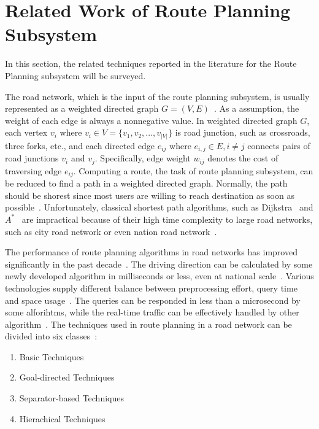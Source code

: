 \documentclass[conference]{IEEEtran}
\begin{document}
\section{Related Work of Route Planning Subsystem}\label{sec:route_planner}
In this section, the related techniques reported in the literature for the Route Planning subsystem will be surveyed.

The road network, which is the input of the route planning subsystem, is usually represented as a weighted directed graph $G=(V, E)$~\cite{self_driving}. As a assumption, the weight of each edge is always a nonnegative value. In weighted directed graph $G$, each vertex $v_i$ where $v_i \in V=\{v_1, v_2, ..., v_{|V|}\}$ is road junction, such as crossroads, three forks, etc., and each directed edge $e_{ij}$ where $e_{i,j} \in E, i \neq j$ connects pairs of road junctions $v_i$ and $v_j$. Specifically, edge weight $w_{ij}$ denotes the cost of traversing edge $e_{ij}$. Computing a route, the task of route planning subsystem, can be reduced to find a path in a weighted directed graph. Normally, the path should be shorest since most users are willing to reach destination as soon as possible~\cite{self_driving}. Unfortunately, classical shortest path algorithms, such as Dijkstra~\cite{dijkstra1959note} and $A^*$~\cite{Hart1968formal} are impractical because of their high time complexity to large road networks, such as city road network or even nation road network~\cite{self_driving}.

The performance of route planning algorithms in road networks has improved significantly in the past decade~\cite{self_driving}. The driving direction can be calculated by some newly developed algorithm in milliseconds or less, even at national scale~\cite{bast2016route}. Various technologies supply different balance between preprocessing effort, query time and space usage~\cite{bast2016route}. The queries can be responded in less than a microsecond by some alforihtms, while the real-time traffic can be effectively handled by other algorithm~\cite{bast2016route}. The techniques used in route planning in a road network can be divided into six classes~\cite{bast2016route}:
\begin{enumerate}
	\item Basic Techniques
	\item Goal-directed Techniques
	\item Separator-based Techniques
	\item Hierachical Techniques
\end{enumerate}
\end{document}

